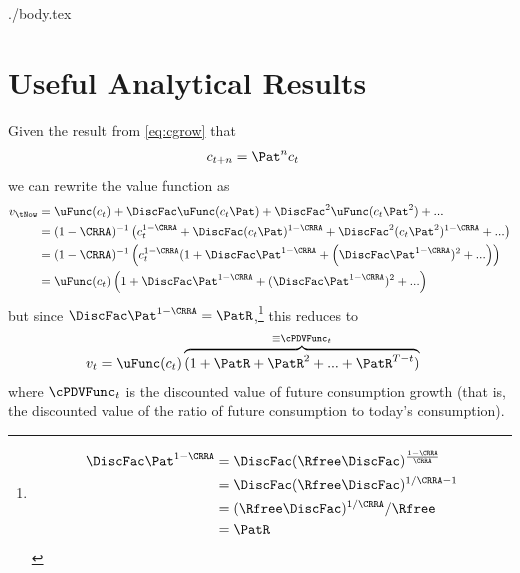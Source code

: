 \documentclass{handout}
\begin{document}
\begin{verbatimwrite}{./body.tex}
\hypertarget{Useful-Analytical-Results}{}
\section{Useful Analytical Results}

Given the result from  \eqref{eq:cgrow} that
\begin{equation}\begin{gathered}\begin{aligned}
  c_{t+n} & =  \Pat^{n} c_{t} \notag
\end{aligned}\end{gathered}\end{equation}
we can rewrite the value function as
\begin{equation}\begin{gathered}\begin{aligned}
  v_{\tNow} & =  \uFunc(c_{t}) + \DiscFac \uFunc(c_{t}\Pat) + \DiscFac^{2} \uFunc(c_{t} \Pat^{2}) + ...
  \\ & =  (1-\CRRA)^{-1}\left(c_{t}^{1-\CRRA} + \DiscFac (c_{t}\Pat)^{1-\CRRA} + \DiscFac^{2} (c_{t} \Pat^{2})^{1-\CRRA} + ...\right)\notag 
  \\ & =  (1-\CRRA)^{-1}\left(c_{t}^{1-\CRRA}(1+\DiscFac \Pat^{1-\CRRA} + \left(\DiscFac \Pat^{1-\CRRA})^{2} + ... \right) \right)\notag 
\\ & =  \uFunc(c_{t})\left(1+\DiscFac \Pat^{1-\CRRA} + (\DiscFac \Pat^{1-\CRRA})^{2} + ... \right)\notag 
\end{aligned}\end{gathered}\end{equation}
but since $\DiscFac \Pat^{1-\CRRA} = \PatR$,\footnote{
\begin{equation}\begin{gathered}\begin{aligned}
  \DiscFac \Pat^{1-\CRRA} & =  \DiscFac (\Rfree \DiscFac)^{\frac{1-\CRRA}{\CRRA}}
  \\ & =                               \DiscFac (\Rfree \DiscFac)^{1/\CRRA-1}
  \\ & =             (\Rfree \DiscFac)^{1/\CRRA} / \Rfree
           \\ & =  \PatR
\end{aligned}\end{gathered}\end{equation}}
this reduces to  \hypertarget{vFuncAnalytical}{}
\begin{equation}\begin{gathered}\begin{aligned}
  v_{t} &=  \uFunc(c_{t})\overbrace{(1+\PatR+\PatR^{2}+...+\PatR^{T-t})}^{\equiv \cPDVFunc_{t}} \label{eq:vFuncAnalytical}
\end{aligned}\end{gathered}\end{equation}
where $\cPDVFunc_{t}$ is the discounted value of future consumption growth (that is, the discounted value of the ratio of future consumption to today's consumption).  


\end{verbatimwrite}
\end{document}

